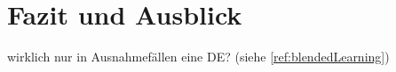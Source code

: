\chapter{Fazit und Ausblick}\label{ref:chaptSummary}
\begin{k}
wirklich nur in Ausnahmefällen eine DE? (siehe \ref{ref:blendedLearning})
\end{k}